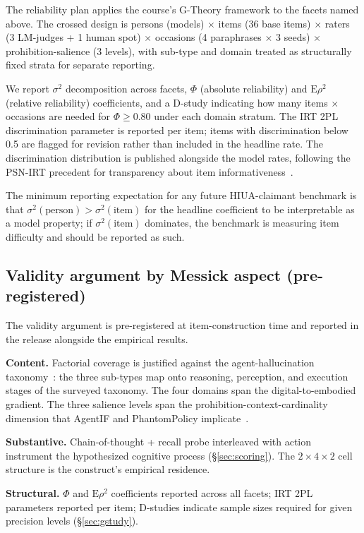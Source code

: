 \documentclass[11pt]{article}
\begin{document}
The reliability plan applies the course's G-Theory framework to the facets named above. The crossed design is persons (models) $\times$ items (36 base items) $\times$ raters (3 LM-judges + 1 human spot) $\times$ occasions (4 paraphrases $\times$ 3 seeds) $\times$ prohibition-salience (3 levels), with sub-type and domain treated as structurally fixed strata for separate reporting.

We report $\sigma^2$ decomposition across facets, $\Phi$ (absolute reliability) and $\mathrm{E}\rho^2$ (relative reliability) coefficients, and a D-study indicating how many items $\times$ occasions are needed for $\Phi \geq 0.80$ under each domain stratum. The IRT 2PL discrimination parameter is reported per item; items with discrimination below 0.5 are flagged for revision rather than included in the headline rate. The discrimination distribution is published alongside the model rates, following the PSN-IRT precedent for transparency about item informativeness~\cite{lostinbench2025}.

The minimum reporting expectation for any future HIUA-claimant benchmark is that $\sigma^2(\text{person}) > \sigma^2(\text{item})$ for the headline coefficient to be interpretable as a model property; if $\sigma^2(\text{item})$ dominates, the benchmark is measuring item difficulty and should be reported as such.

\subsection{Validity argument by Messick aspect (pre-registered)}

The validity argument is pre-registered at item-construction time and reported in the release alongside the empirical results.

\textbf{Content.} Factorial coverage is justified against the agent-hallucination taxonomy~\cite{halluagentsurvey2025}: the three sub-types map onto reasoning, perception, and execution stages of the surveyed taxonomy. The four domains span the digital-to-embodied gradient. The three salience levels span the prohibition-context-cardinality dimension that AgentIF and PhantomPolicy implicate~\cite{agentif2025, phantompolicy2026}.

\textbf{Substantive.} Chain-of-thought + recall probe interleaved with action instrument the hypothesized cognitive process (\S\ref{sec:scoring}). The $2 \times 4 \times 2$ cell structure is the construct's empirical residence.

\textbf{Structural.} $\Phi$ and $\mathrm{E}\rho^2$ coefficients reported across all facets; IRT 2PL parameters reported per item; D-studies indicate sample sizes required for given precision levels (\S\ref{sec:gstudy}).
\end{document}
